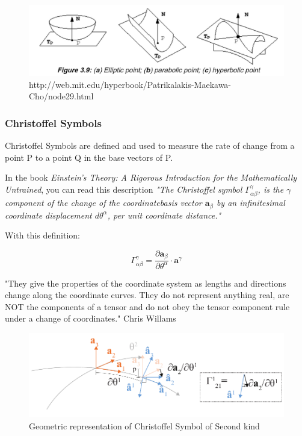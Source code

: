 \begin{figure}[H]
\centering
\includegraphics[width = 1\linewidth ]{figure/Theory/SecondFF2.JPG}
\caption{http://web.mit.edu/hyperbook/Patrikalakis-Maekawa-Cho/node29.html}
\end{figure}

\subsubsection{Christoffel Symbols}

Christoffel Symbols are defined and used to measure the rate of change from a point P to a point Q in the base vectors of P.



In the book  \textit{Einstein's Theory: A Rigorous Introduction for the Mathematically Untrained}, you can read this description \textit{ "The Christoffel symbol $\Gamma^\gamma_{\alpha \beta}$, is the $\gamma$ component of the change of the coordinatebasis vector $ \textbf{a}_\beta $ by an infinitesimal coordinate displacement $ d\theta^\alpha $, per unit coordinate
distance."} 

With this definition:

\begin{equation}
\Gamma^\gamma_{\alpha \beta} = \frac{\partial\textbf{a}_\beta}{\partial\theta^\alpha}\cdot \textbf{a}^\gamma
\end{equation}



"They give the properties of the coordinate system as lengths and directions change along the coordinate curves. They do not represent anything real, are NOT the components of a tensor and do not obey the tensor component rule under a change of coordinates." Chris Willams

\begin{figure}[H]
\centering
\includegraphics[width=0.9\linewidth ]{figure/Theory/christoffelSecondKind.pdf}
\caption{ Geometric representation of Christoffel Symbol of Second kind }
\end{figure}

